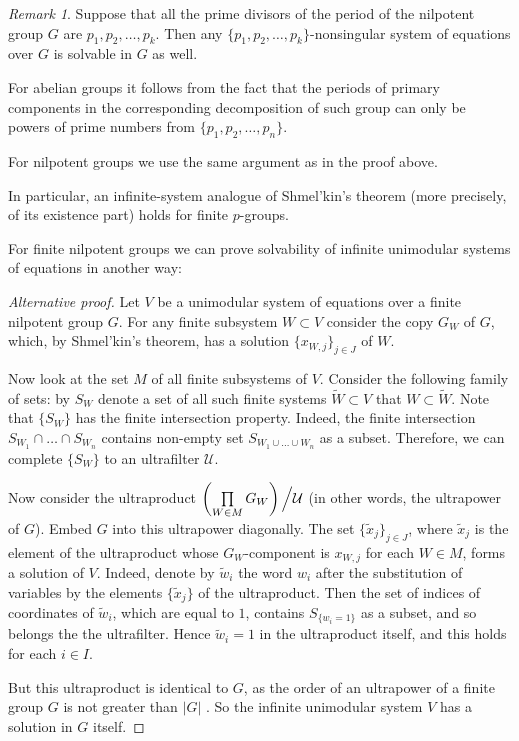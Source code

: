 \documentclass{article}
\theoremstyle{definition}
\theoremstyle{remark}
\newtheorem*{rem}{Remark}
\let\tilde\widetilde
\begin{document}
\begin{rem}
Suppose that all the prime divisors of the period
of the nilpotent group $G$ are
$p_1,p_2,\ldots,p_k$. Then any
$\{p_1,p_2,\ldots,p_k\}$-nonsingular system of equations
over $G$ is solvable in $G$ as well.

For abelian groups it follows from the fact that
the periods of primary components
in the corresponding decomposition of such group
can only be powers of prime numbers from $\{p_1,p_2,\ldots,p_n\}$.

For nilpotent groups we use the same argument as in the proof above.

In particular, an infinite-system analogue of Shmel'kin's
theorem (more precisely, of its existence part)
holds for finite $p$-groups.
\end{rem} 

For finite nilpotent groups we can prove solvability
of infinite unimodular systems of equations
in another way:
\begin{proof}[Alternative proof]
Let $V$ be a unimodular system of equations over a finite nilpotent group $G$.
For any finite subsystem $W\subset V$ consider the copy
$G_W$ of $G$, which, by Shmel'kin's theorem,
has a solution $\{x_{W,j}\}_{j \in J}$ of $W$.

Now look at the set $M$ of all finite subsystems of $V$.
Consider the following family of sets:
by $S_W$ denote a set of all such finite systems
$\tilde W \subset V$ that $W \subset \tilde W$.
Note that $\{S_W\}$ has the finite intersection property.
Indeed, the finite intersection
$S_{W_1} \cap \ldots \cap S_{W_n}$
contains non-empty set $S_{W_1 \cup \ldots \cup W_n}$
as a subset.
Therefore, we can complete $\{S_W\}$ to an ultrafilter $\mathcal U$.

Now consider the ultraproduct
$\left( \prod\limits_{W \in M} G_W \right) \Bigl/ \mathcal U$
(in other words, the ultrapower of $G$). Embed $G$ into this ultrapower diagonally.
The set $\{ \tilde x_j\}_{j\in J}$, where $\tilde x_j$ is the element
of the ultraproduct
whose $G_W$-component is $x_{W,j}$ for each $W \in M$,
forms a solution of $V$.
Indeed, denote by $\tilde w_i$ the word $w_i$ after the substitution of variables by
the elements $\{\tilde x_j\}$ of the ultraproduct.
Then the set of indices of coordinates of $\tilde w_i$, which are equal to $1$,
contains $S_{\{w_i=1\}}$ as a subset, and so belongs the the ultrafilter.
Hence $\tilde w_i=1$ in the ultraproduct itself, and this holds for each $i \in I$.

But this ultraproduct is identical to $G$, as the order of an
ultrapower of a finite group $G$ is not greater than $|G|$
\cite[chapter IV, \S 8, item 8.5]{Mal70}.
So the infinite unimodular system $V$
has a solution in $G$ itself.
\end{proof}
\end{document}
